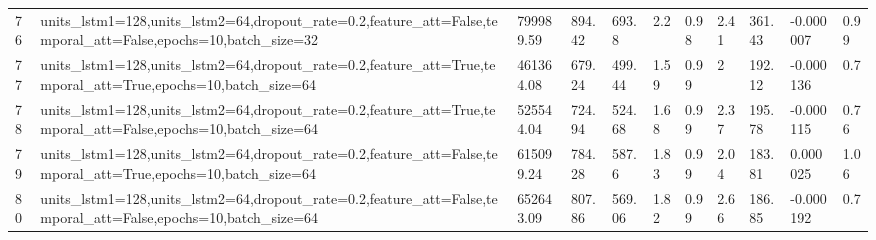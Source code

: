\begin{longtable}{C{0.8cm} L{2cm} C{1.15cm} C{1.15cm} C{1.15cm} C{1.15cm} C{0.85cm} C{1.25cm} C{1.2cm} C{1.5cm} C{1.0cm}}
76 & units\_lstm1=128,\newline units\_lstm2=64,\newline dropout\_rate=0.2,\newline feature\_att=False,\newline temporal\_att=False,\newline epochs=10,\newline batch\_size=32 & 799989.59 & 894.42 & 693.8 & 2.2 & 0.98 & 2.41 & 361.43 & -0.000007 & 0.99 \\
77 & units\_lstm1=128,\newline units\_lstm2=64,\newline dropout\_rate=0.2,\newline feature\_att=True,\newline temporal\_att=True,\newline epochs=10,\newline batch\_size=64 & 461364.08 & 679.24 & 499.44 & 1.59 & 0.99 & 2 & 192.12 & -0.000136 & 0.7 \\
78 & units\_lstm1=128,\newline units\_lstm2=64,\newline dropout\_rate=0.2,\newline feature\_att=True,\newline temporal\_att=False,\newline epochs=10,\newline batch\_size=64 & 525544.04 & 724.94 & 524.68 & 1.68 & 0.99 & 2.37 & 195.78 & -0.000115 & 0.76 \\
79 & units\_lstm1=128,\newline units\_lstm2=64,\newline dropout\_rate=0.2,\newline feature\_att=False,\newline temporal\_att=True,\newline epochs=10,\newline batch\_size=64 & 615099.24 & 784.28 & 587.6 & 1.83 & 0.99 & 2.04 & 183.81 & 0.000025 & 1.06 \\
80 & units\_lstm1=128,\newline units\_lstm2=64,\newline dropout\_rate=0.2,\newline feature\_att=False,\newline temporal\_att=False,\newline epochs=10,\newline batch\_size=64 & 652643.09 & 807.86 & 569.06 & 1.82 & 0.99 & 2.66 & 186.85 & -0.000192 & 0.7 \\

\end{longtable}
